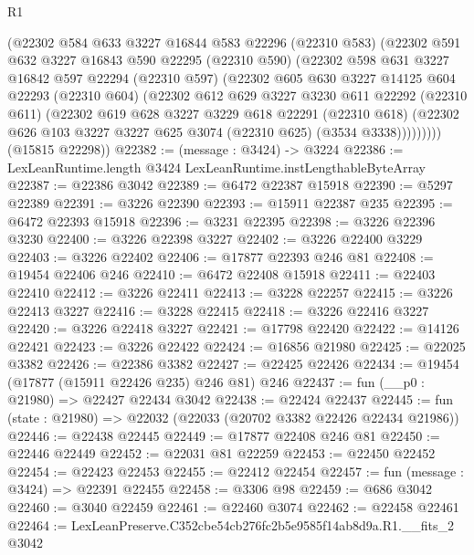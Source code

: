 \begin{lexlean}{R1}
\begin{coremodule}
        (@22302
          @584
          @633
          @3227
          @16844
          @583
          @22296
          (@22310 @583)
          (@22302
            @591
            @632
            @3227
            @16843
            @590
            @22295
            (@22310 @590)
            (@22302
              @598
              @631
              @3227
              @16842
              @597
              @22294
              (@22310 @597)
              (@22302
                @605
                @630
                @3227
                @14125
                @604
                @22293
                (@22310 @604)
                (@22302
                  @612
                  @629
                  @3227
                  @3230
                  @611
                  @22292
                  (@22310 @611)
                  (@22302
                    @619
                    @628
                    @3227
                    @3229
                    @618
                    @22291
                    (@22310 @618)
                    (@22302 @626 @103 @3227 @3227 @625 @3074 (@22310 @625) (@3534 @3338)))))))))
      (@15815 @22298))
@22382 := (message : @3424) -> @3224
@22386 := LexLeanRuntime.length @3424 LexLeanRuntime.instLengthableByteArray
@22387 := @22386 @3042
@22389 := @6472 @22387 @15918
@22390 := @5297 @22389
@22391 := @3226 @22390
@22393 := @15911 @22387 @235
@22395 := @6472 @22393 @15918
@22396 := @3231 @22395
@22398 := @3226 @22396 @3230
@22400 := @3226 @22398 @3227
@22402 := @3226 @22400 @3229
@22403 := @3226 @22402
@22406 := @17877 @22393 @246 @81
@22408 := @19454 @22406 @246
@22410 := @6472 @22408 @15918
@22411 := @22403 @22410
@22412 := @3226 @22411
@22413 := @3228 @22257
@22415 := @3226 @22413 @3227
@22416 := @3228 @22415
@22418 := @3226 @22416 @3227
@22420 := @3226 @22418 @3227
@22421 := @17798 @22420
@22422 := @14126 @22421
@22423 := @3226 @22422
@22424 := @16856 @21980
@22425 := @22025 @3382
@22426 := @22386 @3382
@22427 := @22425 @22426
@22434 := @19454 (@17877 (@15911 @22426 @235) @246 @81) @246
@22437 := fun (__p0 : @21980) => @22427 @22434 @3042
@22438 := @22424 @22437
@22445 := fun (state : @21980) => @22032 (@22033 (@20702 @3382 @22426 @22434 @21986))
@22446 := @22438 @22445
@22449 := @17877 @22408 @246 @81
@22450 := @22446 @22449
@22452 := @22031 @81 @22259
@22453 := @22450 @22452
@22454 := @22423 @22453
@22455 := @22412 @22454
@22457 := fun (message : @3424) => @22391 @22455
@22458 := @3306 @98
@22459 := @686 @3042
@22460 := @3040 @22459
@22461 := @22460 @3074
@22462 := @22458 @22461
@22464 := LexLeanPreserve.C352cbe54cb276fc2b5e9585f14ab8d9a.R1.__fits_2 @3042

\end{coremodule}
\end{lexlean}
